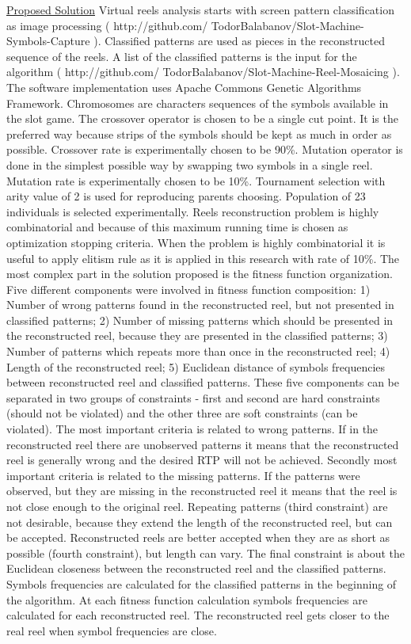 \documentclass{article}
\begin{document}
\underline{Proposed Solution} Virtual reels analysis starts with screen pattern classification as image processing ( http://github.com/ TodorBalabanov/Slot-Machine-Symbols-Capture ). Classified patterns are used as pieces in the reconstructed sequence of the reels. A list of the classified patterns is the input for the algorithm ( http://github.com/ TodorBalabanov/Slot-Machine-Reel-Mosaicing ). The software implementation uses Apache Commons Genetic Algorithms Framework. Chromosomes are characters sequences of the symbols available in the slot game. The crossover operator is chosen to be a single cut point. It is the preferred way because strips of the symbols should be kept as much in order as possible. Crossover rate is experimentally chosen to be 90\%. Mutation operator is done in the simplest possible way by swapping two symbols in a single reel. Mutation rate is experimentally chosen to be 10\%. Tournament selection with arity value of 2 is used for reproducing parents choosing. Population of 23 individuals is selected experimentally. Reels reconstruction problem is highly combinatorial and because of this maximum running time is chosen as optimization stopping criteria. When the problem is highly combinatorial it is useful to apply elitism rule as it is applied in this research with rate of 10\%. The most complex part in the solution proposed is the fitness function organization. Five different components were involved in fitness function composition: 1) Number of wrong patterns found in the reconstructed reel, but not presented in classified patterns; 2) Number of missing patterns which should be presented in the reconstructed reel, because they are presented in the classified patterns; 3) Number of patterns which repeats more than once in the reconstructed reel; 4) Length of the reconstructed reel; 5) Euclidean distance of symbols frequencies between reconstructed reel and classified patterns. These five components can be separated in two groups of constraints - first and second are hard constraints (should not be violated) and the other three are soft constraints (can be violated). The most important criteria is related to wrong patterns. If in the reconstructed reel there are unobserved patterns it means that the reconstructed reel is generally wrong and the desired RTP will not be achieved. Secondly most important criteria is related to the missing patterns. If the patterns were observed, but they are missing in the reconstructed reel it means that the reel is not close enough to the original reel. Repeating patterns (third constraint) are not desirable, because they extend the length of the reconstructed reel, but can be accepted. Reconstructed reels are better accepted when they are as short as possible (fourth constraint), but length can vary. The final constraint is about the Euclidean closeness between the reconstructed reel and the classified patterns. Symbols frequencies are calculated for the classified patterns in the beginning of the algorithm. At each fitness function calculation symbols frequencies are calculated for each reconstructed reel. The reconstructed reel gets closer to the real reel when symbol frequencies are close. 
\vspace*{3mm}
\end{document}
